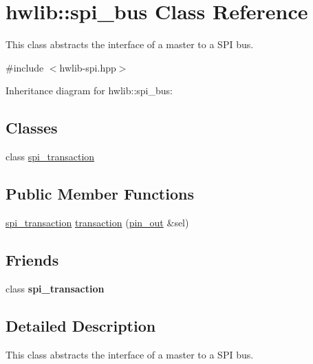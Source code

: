 \hypertarget{classhwlib_1_1spi__bus}{}\section{hwlib\+:\+:spi\+\_\+bus Class Reference}
\label{classhwlib_1_1spi__bus}


This class abstracts the interface of a master to a S\+PI bus.  




{\ttfamily \#include $<$hwlib-\/spi.\+hpp$>$}



Inheritance diagram for hwlib\+:\+:spi\+\_\+bus\+:
\subsection*{Classes}
\begin{DoxyCompactItemize}
\item 
class \hyperlink{classhwlib_1_1spi__bus_1_1spi__transaction}{spi\+\_\+transaction}
\end{DoxyCompactItemize}
\subsection*{Public Member Functions}
\begin{DoxyCompactItemize}
\item 
\hyperlink{classhwlib_1_1spi__bus_1_1spi__transaction}{spi\+\_\+transaction} \hyperlink{classhwlib_1_1spi__bus_ad28cd2173d2401a5a4437ff1d76175b5}{transaction} (\hyperlink{classhwlib_1_1pin__out}{pin\+\_\+out} \&sel)
\end{DoxyCompactItemize}
\subsection*{Friends}
\begin{DoxyCompactItemize}
\item 
\mbox{\label{classhwlib_1_1spi__bus_a23d4f1ca4950a4246d61609c0c5b70f3}} 
class {\bfseries spi\+\_\+transaction}
\end{DoxyCompactItemize}


\subsection{Detailed Description}
This class abstracts the interface of a master to a S\+PI bus. 

